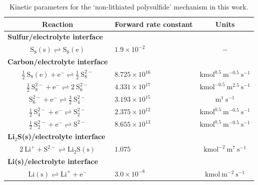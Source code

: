 \documentclass{elsarticle}
\begin{document}
\begin{table}[h!]
\begin{center}
\begin{tabular}{ clc } 
 \hline\hline
 Reaction & Forward rate constant & Units \\ 
 \hline
 \multicolumn{1}{l}{\bf Sulfur/electrolyte interface} & &   \\
 $\mathrm{S}_8(\mathrm{s}) \rightleftharpoons \mathrm{S}_8(\mathrm{e})$ & $1.9 \times 10^{-2}$ & $ - $ \\ 
 \hline
 \multicolumn{1}{l}{\bf Carbon/electrolyte interface} & & \\
 $\frac{1}{2} ~ \mathrm{S}_8(\mathrm{e}) + \mathrm{e}^- \rightleftharpoons \frac{1}{2} ~ \mathrm{S}_8^{2-}$ & $8.725 \times 10^{16}$ & $\mathrm{kmol}^{0.5} ~ \mathrm{m}^{-0.5} ~ \mathrm{s}^{-1}$   \\
 
 $\frac{3}{2} ~ \mathrm{S}_8^{2-} + \mathrm{e}^- \rightleftharpoons 2 ~ \mathrm{S}_6^{2-}$ & $4.331 \times 10^{17}$ & $\mathrm{kmol}^{-0.5} ~ \mathrm{m}^{2.5} ~ \mathrm{s}^{-1}$  \\
 
  $\mathrm{S}_6^{2-} + \mathrm{e}^- \rightleftharpoons \frac{3}{2} ~ \mathrm{S}_4^{2-}$ & $3.193 \times 10^{15}$ & $\mathrm{m}^{1} ~ \mathrm{s}^{-1}$  \\
 
  $\frac{1}{2} ~ \mathrm{S}_4^{2-} + \mathrm{e}^- \rightleftharpoons \mathrm{S}_2^{2-}$ & $2.375 \times 10^{12} $ & $ \mathrm{kmol}^{0.5} ~ \mathrm{m}^{-0.5} ~ \mathrm{s}^{-1}$  \\
 
  $\frac{1}{2} ~ \mathrm{S}_2^{2-} + \mathrm{e}^- \rightleftharpoons \mathrm{S}^{2-}$ &$8.655 \times 10^{13} $ & $ \mathrm{kmol}^{0.5} ~ \mathrm{m}^{-0.5} ~ \mathrm{s}^{-1}$  \\
 \hline
 \multicolumn{1}{l}{\bf Li$_2$S(s)/electrolyte interface} & &  \\
  $2 ~ \mathrm{Li}^+ + \mathrm{S}^{2-} \rightleftharpoons \mathrm{Li}_2\mathrm{S}(\mathrm{s})$ & $1.075 $ & $ \mathrm{kmol}^{-2} ~ \mathrm{m}^{7} ~ \mathrm{s}^{-1}$  \\
 \hline
 \multicolumn{1}{l}{\bf Li(s)/electrolyte interface} & &  \\
  $\mathrm{Li}(\mathrm{s}) \rightleftharpoons \mathrm{Li}^+ + \mathrm{e}^-$ & $3.0 \times 10^{-8} $ & $\mathrm{kmol} ~ \mathrm{m}^{-2} ~ \mathrm{s}^{-1}$  \\
 \hline\hline
 \end{tabular}
 \caption{Kinetic parameters for the `non-lithiated polysulfide' mechanism in this work.}
\label{tab:non_lithiated_kinetics}
\end{center}
 \end{table}
 
\end{document}
